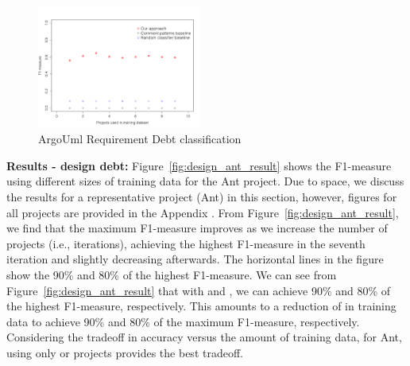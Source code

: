 \begin{figure}[t]
  \centering
  \includegraphics[width = 0.48\textwidth]{figures/implementation_argo}
  \vspace{-3mm}
  \caption{ArgoUml Requirement Debt classification}
  \label{fig:implementation_argo_result}
\end{figure}


\noindent \textbf{Results - design debt:}  Figure~\ref{fig:design_ant_result} shows the F1-measure using different sizes of training data for the Ant project. Due to space, we discuss the results for a representative project (Ant) in this section, however, figures for all projects are provided in the Appendix . From Figure~\ref{fig:design_ant_result}, we find that the maximum F1-measure improves as we increase the number of projects (i.e., iterations), achieving the highest F1-measure in the seventh iteration and slightly decreasing afterwards. The horizontal lines in the figure show the 90\% and 80\% of the highest F1-measure. We can see from Figure~\ref{fig:design_ant_result} that with  and , we can achieve 90\% and 80\% of the highest F1-measure, respectively. This amounts to a reduction of  in training data to achieve 90\% and 80\% of the maximum F1-measure, respectively. Considering the tradeoff in accuracy versus the amount of training data, for Ant, using only  or  projects provides the best tradeoff.


